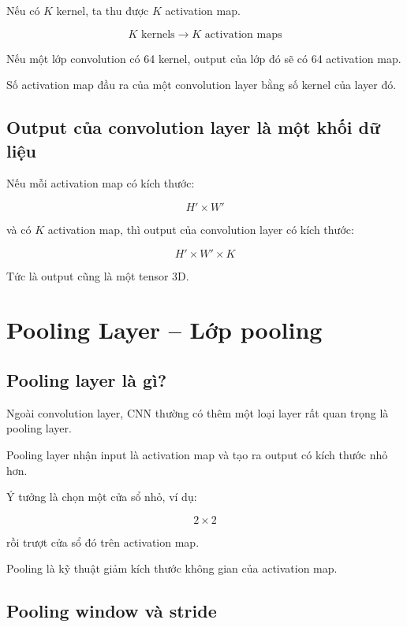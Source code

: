 Nếu có $K$ kernel, ta thu được $K$ activation map.

\[
    K \text{ kernels}
    \rightarrow
    K \text{ activation maps}
\]

Nếu một lớp convolution có 64 kernel, output của lớp đó sẽ có 64 activation map.

\begin{ghinho}
Số activation map đầu ra của một convolution layer bằng số kernel của layer đó.
\end{ghinho}

\subsection{Output của convolution layer là một khối dữ liệu}

Nếu mỗi activation map có kích thước:

\[
    H' \times W'
\]

và có $K$ activation map, thì output của convolution layer có kích thước:

\[
    H' \times W' \times K
\]

Tức là output cũng là một tensor 3D.

\section{Pooling Layer -- Lớp pooling}

\subsection{Pooling layer là gì?}

Ngoài convolution layer, CNN thường có thêm một loại layer rất quan trọng là pooling layer.

Pooling layer nhận input là activation map và tạo ra output có kích thước nhỏ hơn.

Ý tưởng là chọn một cửa sổ nhỏ, ví dụ:

\[
    2\times2
\]

rồi trượt cửa sổ đó trên activation map.

\begin{ghinho}
Pooling là kỹ thuật giảm kích thước không gian của activation map.
\end{ghinho}

\subsection{Pooling window và stride}

